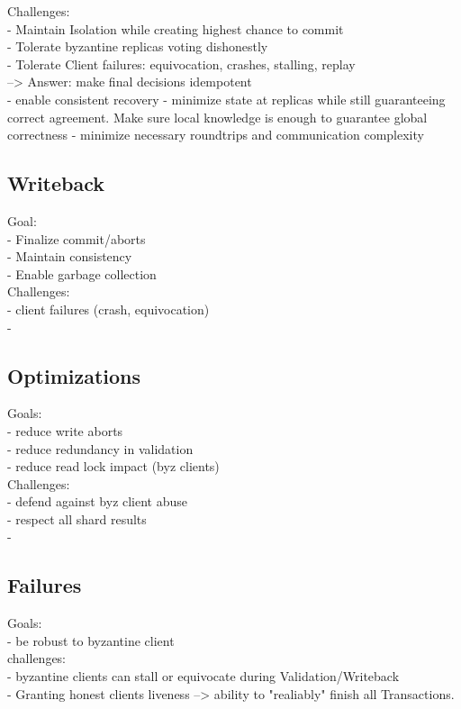 Challenges:\\
- Maintain Isolation while creating highest chance to commit\\
- Tolerate byzantine replicas voting dishonestly\\
- Tolerate Client failures: equivocation, crashes, stalling, replay\\
--> Answer: make final decisions idempotent\\
- enable consistent recovery
- minimize state at replicas while still guaranteeing correct agreement. Make sure local knowledge is enough to guarantee global correctness
- minimize necessary roundtrips and communication complexity



\subsection{Writeback}
Goal: \\
- Finalize commit/aborts\\
- Maintain consistency\\
- Enable garbage collection\\

Challenges:\\
- client failures (crash, equivocation)\\
- 


\subsection{Optimizations}
Goals:\\
- reduce write aborts\\
- reduce redundancy in validation\\
- reduce read lock impact (byz clients)\\

Challenges:\\
- defend against byz client abuse\\
- respect all shard results\\
- 

\subsection{Failures}
Goals:\\
- be robust to byzantine client\\


challenges:\\
- byzantine clients can stall or equivocate during Validation/Writeback\\
- Granting honest clients liveness --> ability to "realiably" finish all Transactions.\\